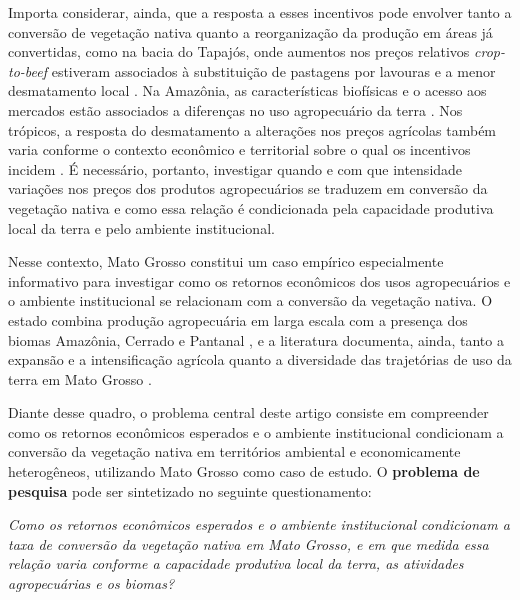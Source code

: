 Importa considerar, ainda, que a resposta a esses incentivos pode envolver tanto a conversão de vegetação nativa quanto a reorganização da produção em áreas já convertidas, como na bacia do Tapajós, onde aumentos nos preços relativos \textit{crop-to-beef} estiveram associados à substituição de pastagens por lavouras e a menor desmatamento local \cite{Braganca2018}. Na Amazônia, as características biofísicas e o acesso aos mercados estão associados a diferenças no uso agropecuário da terra \cite{ChomitzThomas2003}. Nos trópicos, a resposta do desmatamento a alterações nos preços agrícolas também varia conforme o contexto econômico e territorial sobre o qual os incentivos incidem \cite{BermanEtAl2023}. É necessário, portanto, investigar quando e com que intensidade variações nos preços dos produtos agropecuários se traduzem em conversão da vegetação nativa e como essa relação é condicionada pela capacidade produtiva local da terra e pelo ambiente institucional.

Nesse contexto, Mato Grosso constitui um caso empírico especialmente informativo para investigar como os retornos econômicos dos usos agropecuários e o ambiente institucional se relacionam com a conversão da vegetação nativa. O estado combina produção agropecuária em larga escala com a presença dos biomas Amazônia, Cerrado e Pantanal \cite{VanWeyEtAl2013}, e a literatura documenta, ainda, tanto a expansão e a intensificação agrícola quanto a diversidade das trajetórias de uso da terra em Mato Grosso \cite{SimoesEtAl2020}.


Diante desse quadro, o problema central deste artigo consiste em compreender como os retornos econômicos esperados e o ambiente institucional condicionam a conversão da vegetação nativa em territórios ambiental e economicamente heterogêneos, utilizando Mato Grosso como caso de estudo. O \textbf{problema de pesquisa} pode ser sintetizado no seguinte questionamento:

\medskip

\noindent\emph{Como os retornos econômicos esperados e o ambiente institucional condicionam a taxa de conversão da vegetação nativa em Mato Grosso, e em que medida essa relação varia conforme a capacidade produtiva local da terra, as atividades agropecuárias e os biomas?}

